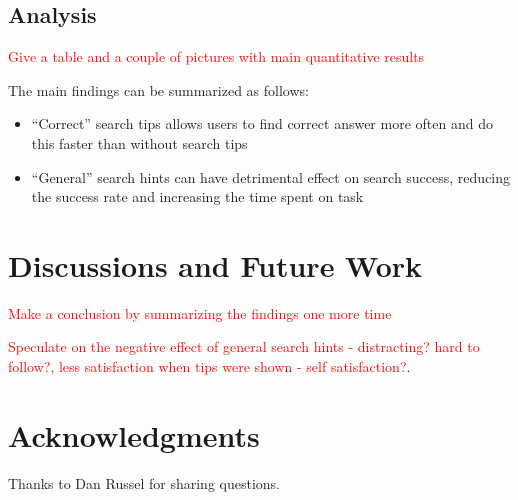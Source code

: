 \documentclass{sig-alternate}
\newcommand\todo[1]{\textcolor{red}{#1}}
\begin{document}
\subsection{Analysis}
\todo{Give a table and a couple of pictures with main quantitative results}

The main findings can be summarized as follows:
\begin{itemize}
\item ``Correct'' search tips allows users to find correct answer more often and do this faster than without search tips
\item ``General'' search hints can have detrimental effect on search success, reducing the success rate and increasing the time spent on task
\end{itemize}

\section{Discussions and Future Work}
\todo{Make a conclusion by summarizing the findings one more time}

\todo{Speculate on the negative effect of general search hints - distracting? hard to follow?, less satisfaction when tips were shown - self satisfaction?}. 

\section{Acknowledgments}
Thanks to Dan Russel for sharing questions.

%

%
%
\end{document}
